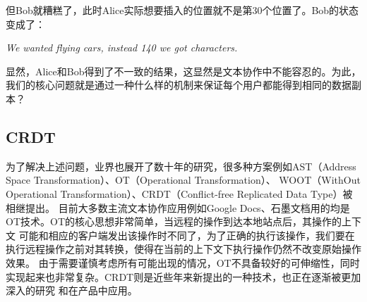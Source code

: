 \documentclass[11pt]{ctexart}
\begin{document}
但Bob就糟糕了，此时Alice实际想要插入的位置就不是第30个位置了。Bob的状态变成了：
\begin{center}
    \textit{We wanted flying cars, instead 140 we got characters.}
\end{center}

显然，Alice和Bob得到了不一致的结果，这显然是文本协作中不能容忍的。为此，我们的核心问题就是通过一种什么样的机制来保证每个用户都能得到相同的数据副本？
\subsection{CRDT}
为了解决上述问题，业界也展开了数十年的研究，很多种方案例如AST（Address Space Transformation）、OT（Operational Transformation）、
WOOT（WithOut Operational Transformation）、CRDT（Conflict-free Replicated Data Type）被相继提出。
目前大多数主流文本协作应用例如Google Docs、石墨文档用的均是OT技术。OT的核心思想非常简单，当远程的操作到达本地站点后，其操作的上下文
可能和相应的客户端发出该操作时不同了，为了正确的执行该操作，我们要在执行远程操作之前对其转换，使得在当前的上下文下执行操作仍然不改变原始操作效果。
由于需要谨慎考虑所有可能出现的情况，OT不具备较好的可伸缩性，同时实现起来也非常复杂。CRDT则是近些年来新提出的一种技术，也正在逐渐被更加深入的研究
和在产品中应用。
\end{document}
